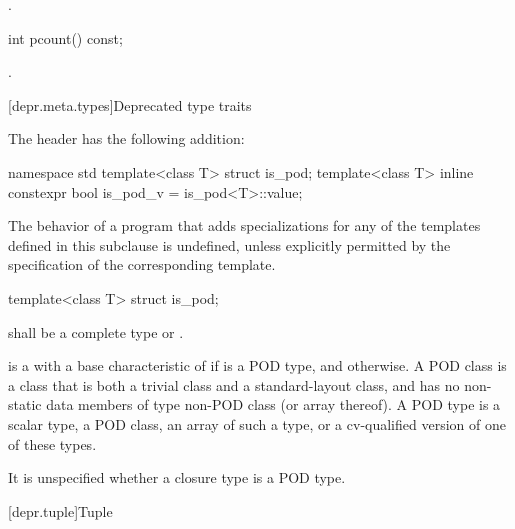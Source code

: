 \begin{itemdescr}
\pnum
\returns
{}.
\end{itemdescr}

%
\begin{itemdecl}
int pcount() const;
\end{itemdecl}

\begin{itemdescr}
\pnum
\returns
{}.
\end{itemdescr}

[depr.meta.types]{Deprecated type traits}

\pnum
The header 
has the following addition:

%
\begin{codeblock}
namespace std {
  template<class T> struct is_pod;
  template<class T> inline constexpr bool is_pod_v = is_pod<T>::value;
}
\end{codeblock}

\pnum
The behavior of a program that adds specializations for
any of the templates defined in this subclause is undefined,
unless explicitly permitted by the specification of the corresponding template.

\begin{itemdecl}
template<class T> struct is_pod;
\end{itemdecl}

\begin{itemdescr}
\pnum
\requires
{} shall be a complete type or \cv{} .

\pnum
{} is a 
with a base characteristic of 
if  is a POD type,
and  otherwise.
%
A POD class is a class that is both a trivial class and a standard-layout class,
and has no non-static data members of type non-POD class (or array thereof).
A POD type is a scalar type, a POD class, an array of such a type,
or a cv-qualified version of one of these types.

\pnum
\begin{note}
It is unspecified whether a closure type is a POD type.
\end{note}
\end{itemdescr}

[depr.tuple]{Tuple}

